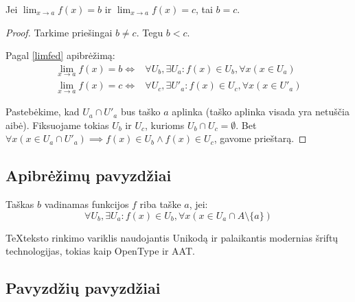\begin{prop}
  Jei $\lim_{x \to a} f(x) = b$ ir $\lim_{x \to a} f(x) = c$, tai $b = c$.
  \begin{proof}
    Tarkime priešingai $b \neq c$. Tegu $b < c$.

    Pagal \ref{limfed} apibrėžimą:
    \begin{align*}
      \lim_{x \to a} f(x) = b \iff &
        \forall U_{b}, \exists U_{a} :
        f(x) \in U_{b}, \forall x(x \in U_{a}) \\
      \lim_{x \to a} f(x) = c \iff &
        \forall U_{c}, \exists U'_{a} :
        f(x) \in U_{c}, \forall x(x \in U'_{a})
    \end{align*}

    Pastebėkime, kad $U_{a} \cap U'_{a}$ bus taško $a$ aplinka (taško
    aplinka visada yra netuščia aibė).
    Fiksuojame tokias $U_{b}$ ir $U_{c}$, kurioms
    $U_{b} \cap U_{c} = \emptyset$. Bet
    $\forall x (x \in U_{a} \cap U'_{a}) \implies
      f(x) \in U_{b} \land f(x) \in U_{c}$, gavome prieštarą.
  \end{proof}
\end{prop}

\subsection{Apibrėžimų pavyzdžiai}

\begin{defn}
  \label{limfed}
  Taškas $b$ vadinamas funkcijos $f$ riba taške $a$, jei:
  \begin{equation*}
    \forall U_b, \exists U_a : f(x) \in U_b,
    \forall x (x \in U_a \cap A \setminus \{a\})
  \end{equation*}
\end{defn}

\begin{defn}[\XeTeX]
  \TeX teksto rinkimo variklis  naudojantis
  Unikodą ir palaikantis modernias šriftų technologijas, tokias kaip
  OpenType ir AAT.
\end{defn}

\subsection{Pavyzdžių pavyzdžiai}

